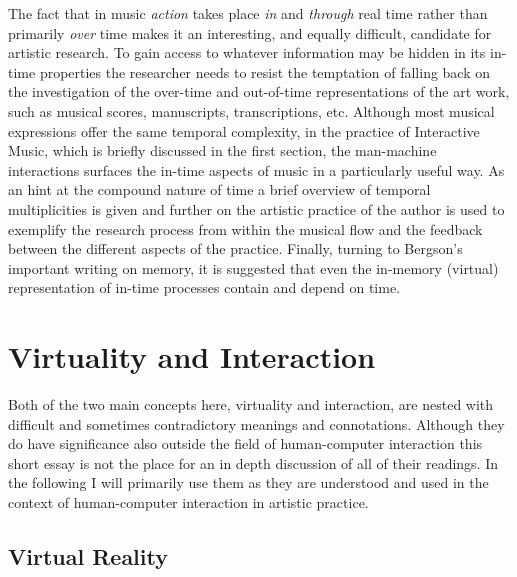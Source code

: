 
The fact that in music \emph{action} takes place \emph{in} and \emph{through} real time rather than primarily \emph{over} time makes it an interesting, and equally difficult, candidate for artistic research. To gain access to whatever information may be hidden in its in-time properties the researcher needs to resist the temptation of falling back on the investigation of the over-time and out-of-time representations of the art work, such as musical scores, manuscripts, transcriptions, etc. Although most musical expressions offer the same temporal complexity, in the practice of Interactive Music, which is briefly discussed in the first section, the man-machine interactions surfaces the in-time aspects of music in a particularly useful way. As an hint at the compound nature of time a brief overview of temporal multiplicities is given and further on the artistic practice of the author is used to exemplify the research process from within the musical flow and the feedback between the different aspects of the practice. Finally, turning to Bergson's important writing on memory, it is suggested that even the in-memory (virtual) representation of in-time processes contain and depend on time.

\section*{Virtuality and Interaction}
\label{sec:why-interaction}

Both of the two main concepts here, virtuality and interaction, are nested with difficult and sometimes contradictory meanings and connotations. Although they do have significance also outside the field of human-computer interaction this short essay is not the place for an in depth discussion of all of their readings. In the following I will primarily use them as they are understood and used in the context of human-computer interaction in artistic practice. 

\subsection*{Virtual Reality}
\label{sec:virtual-reality}

